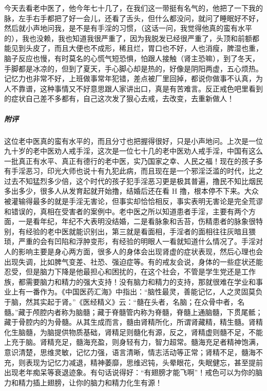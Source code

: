 \begin{case}
    今天去看老中医了，他今年七十几了，在我们这一带挺有名气的，他把了一下我的脉，左手右手都把了好一会儿，还看了舌头，但什么都没问，就问了睡眠好不好，然后就小声地问我，是不是有手淫的习惯，（这话一问，我觉得他真的蛮有水平的），我也没赖，我也知道我很严重了，因为我脱发已经很严重了，头顶和前额都能见到头皮了，而且大便也不成形，稀且烂，胃口也不好，人也消瘦，脾湿也重，脑子反应也慢，有时莫名的心慌气短恐惧，怕跟人接触（肾主恐嘛），到了冬天，手脚都是冰凉的，但到了夏天，手心脚心却是热的，好像是阴阳两虚，五心烦热。记忆力也非常不好，上班做事常年犯错，差点被厂里回掉，都说你做事不认真，为人不靠谱，这种事情又不好意思跟人家讲出口，真是有苦难言。反正戒色吧里看到的症状自己差不多都有，自己这次发了狠心去戒，去改变，去重新做人！
    \subparagraph{附评} 这位老中医真的蛮有水平的，而且分寸也把握得很好，只是小声地问。上次是一位九十岁的老中医劝人戒手淫，这次是一位七十几的老中医劝人戒手淫，中国有这么一批真正有水平、真正有德行的老中医，实乃国家之幸、人民之福！现在的孩子多有手淫恶习，印光大师也说十有九犯此病，而且现在是一个邪淫泛滥的时代，比之过去不知猛烈多少倍，这个时代的孩子犯手淫恶习更是极其普遍，撸民不知比烟民多出多少，很多人从发育起就开始撸，结婚后还在看 H 撸，根本停不下来。大众被灌输得最多的就是手淫无害论，但事实却恰恰相反，事实表明无害论是完全荒谬和错误的，真相在受害者的案例中。老中医之所以知道患者手淫，主要有两个方面，一是看年纪，年纪不大表明没结婚，二是看脉象和舌苔，伤精患者的脉象很特别，有经验的老中医就能识别出，第三就是看面相，手淫者的面相往往灰暗且猥琐，严重的会有凹陷和浮肿变形，有经验的明眼人一看就知道什么情况了。手淫对人的影响主要是身心两方面，很多人的身体会出现肾虚的症状表现，然后心理也会出现失调，比如脾气变差、社恐、强迫症等。有的戒友会说，身体的一些症状还能忍受，但是脑力下降是他最担心和困扰的，在这个社会，不管是学生党还是工作族，都需要脑力和精力的强大支持！没有脑力和精力的支持，那就很难在学业和事业上有一番作为。《中国医药汇海》中指出：“脑性最灵，善能记忆，人之灵固莫负于脑，然其实起于肾。”《医经精义》云：“髓在头者，名脑；在众骨中者，名髓。”藏于颅腔内者称为脑髓；藏于脊髓管内称为脊髓，脊髓上通脑髓，下贯尾骶；藏于骨腔内的为骨髓。从其生成而言，髓由肾精所化，所谓肾藏精，精生髓。肾精化生脑髓，为脑提供物质基础，肾精足则髓化有源，反之，肾精虚则髓不足，不能上充于脑。肾精充足，髓海充盈，则身轻有力，智力超常。髓海充足者精神饱满，意识清楚，思维灵敏，记忆力强，语言清晰，情志活动等正常；肾精不足，髓海不充，则表现为记忆力减退，精神萎靡，思维迟钝，头晕眼花，失眠健忘，甚至提前出现老年痴呆等衰退迹象。有句话说得好：“有翅膀才能飞啊”！戒色可以为你的脑力和精力插上翅膀，让你的脑力和精力化生有源！
\end{case}

